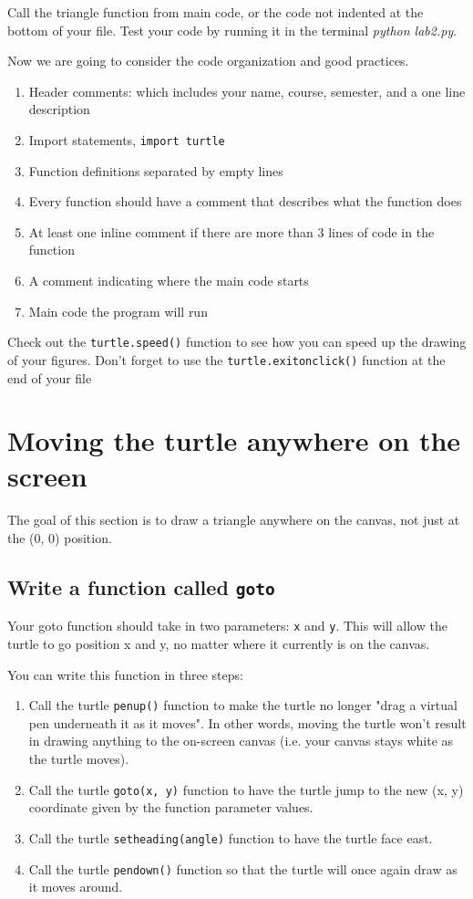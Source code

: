 \documentclass[12pt]{article}
\begin{document}
Call the triangle function from main code, or the code not indented at the bottom of your file. Test your code by running it in the terminal \textit{python lab2.py}.

Now we are going to consider the code organization and good practices.

\begin{enumerate}
\item Header comments: which includes your name, course, semester, and a one line description
\item Import statements, \texttt{import turtle}
\item Function definitions separated by empty lines
\item Every function should have a comment that describes what the function does
\item At least one inline comment if there are more than 3 lines of code in the function
\item A comment indicating where the main code starts
\item Main code the program will run
\end{enumerate}
Check out the \texttt{turtle.speed()} function to see how you can speed up the drawing of your figures.
Don't forget to use the \texttt{turtle.exitonclick()} function at the end of your file 


\section{Moving the turtle anywhere on the screen}
The goal of this section is to draw a triangle anywhere on the canvas, not just at the (0, 0) position.


\subsection{Write a function called \texttt{goto}}
Your goto function should take in two parameters: \texttt{x} and \texttt{y}. This will allow the turtle to go position x and y, no matter where it currently is on the canvas.

You can write this function in three steps:
\begin{enumerate}
\item Call the turtle \texttt{penup()} function to make the turtle no longer "drag a virtual pen underneath it as it moves". In other words, moving the turtle won't result in drawing anything to the on-screen canvas (i.e. your canvas stays white as the turtle moves).
\item Call the turtle \texttt{goto(x, y)} function to have the turtle jump to the new (x, y) coordinate given by the function parameter values.
\item Call the turtle \texttt{setheading(angle)} function to have the turtle face east.
\item Call the turtle \texttt{pendown()} function so that the turtle will once again draw as it moves around.
\end{enumerate}
\end{document}
